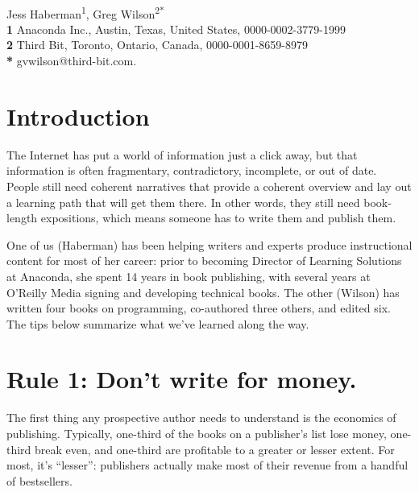 \documentclass[10pt,letterpaper]{article}
\begin{document}
\vspace*{0.2in}

\begin{flushleft}
{\Large
\textbf{}
}
\newline
\\
{Jess Haberman}\textsuperscript{1},
{Greg Wilson}\textsuperscript{2*}
\\
\bigskip
\textbf{1} Anaconda Inc., Austin, Texas, United States, 0000-0002-3779-1999\\
\textbf{2} Third Bit, Toronto, Ontario, Canada, 0000-0001-8659-8979\\
\textbf{*} gvwilson@third-bit.com.
\end{flushleft}

\section*{Introduction}

The Internet has put a world of information just a click away, but
that information is often fragmentary, contradictory, incomplete, or
out of date.  People still need coherent narratives that provide a
coherent overview and lay out a learning path that will get them
there.  In other words, they still need book-length expositions, which
means someone has to write them and publish them.

One of us (Haberman) has been helping writers and experts produce
instructional content for most of her career: prior to becoming
Director of Learning Solutions at Anaconda, she spent 14 years in book
publishing, with several years at O'Reilly Media signing and
developing technical books.  The other (Wilson) has written four books
on programming, co-authored three others, and edited six.  The tips
below summarize what we've learned along the way.

\section*{Rule 1: Don't write for money.}

The first thing any prospective author needs to understand is the
economics of publishing.  Typically, one-third of the books on a
publisher's list lose money, one-third break even, and one-third are
profitable to a greater or lesser extent.  For most, it's ``lesser'':
publishers actually make most of their revenue from a handful of
bestsellers.
\end{document}
